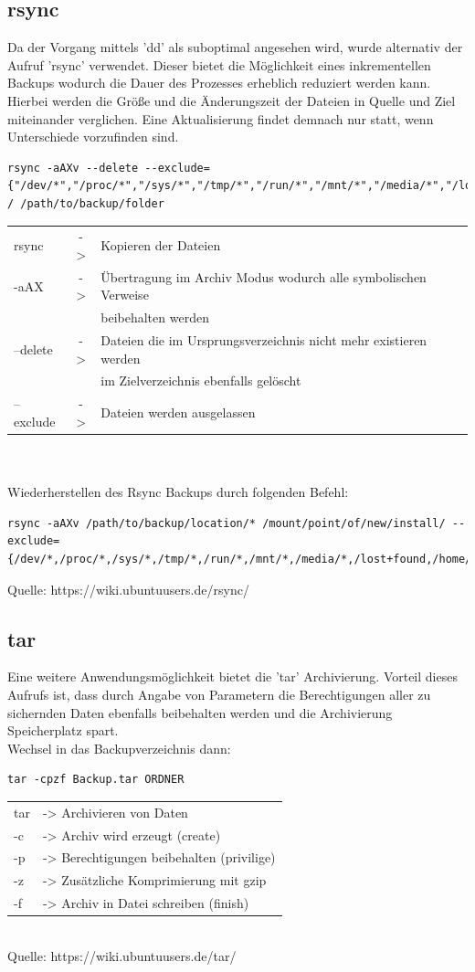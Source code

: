 \subsection{rsync}
Da der Vorgang mittels 'dd' als suboptimal angesehen wird, wurde alternativ der Aufruf 'rsync' verwendet. Dieser bietet die Möglichkeit eines inkrementellen Backups wodurch die Dauer des Prozesses erheblich reduziert werden kann. Hierbei werden die Größe und die Änderungszeit der Dateien in Quelle und Ziel miteinander verglichen. Eine Aktualisierung findet demnach nur statt, wenn Unterschiede vorzufinden sind.
\begin{lstlisting}
rsync -aAXv --delete --exclude={"/dev/*","/proc/*","/sys/*","/tmp/*","/run/*","/mnt/*","/media/*","/lost+found"} / /path/to/backup/folder
\end{lstlisting}
\begin{tabular}{l c l}
rsync	&->& Kopieren der Dateien\\
-aAX	&->& Übertragung im Archiv Modus wodurch alle symbolischen Verweise\\
	&  & beibehalten werden\\
--delete&->& Dateien die im Ursprungsverzeichnis nicht mehr existieren werden\\
	&  & im Zielverzeichnis ebenfalls gelöscht\\
--exclude&->& Dateien werden ausgelassen\\
\end{tabular}\\\\
Wiederherstellen des Rsync Backups durch folgenden Befehl:
\begin{lstlisting}
rsync -aAXv /path/to/backup/location/* /mount/point/of/new/install/ --exclude={/dev/*,/proc/*,/sys/*,/tmp/*,/run/*,/mnt/*,/media/*,/lost+found,/home/*}
\end{lstlisting}
Quelle: https://wiki.ubuntuusers.de/rsync/ \cite{rsync}
\subsection{tar} %
Eine weitere Anwendungsmöglichkeit bietet die 'tar' Archivierung. Vorteil dieses Aufrufs ist, dass durch Angabe von Parametern die Berechtigungen aller zu sichernden Daten ebenfalls beibehalten werden und die Archivierung Speicherplatz spart.\\
Wechsel in das Backupverzeichnis dann:
\begin{lstlisting}
tar -cpzf Backup.tar ORDNER
\end{lstlisting}
\begin{tabular}{l l}
tar	&-> Archivieren von Daten\\
-c	&-> Archiv wird erzeugt (create)\\
-p	&-> Berechtigungen beibehalten (privilige)\\
-z	&-> Zusätzliche Komprimierung mit gzip\\
-f	&-> Archiv in Datei schreiben (finish)\\
\end{tabular}
 ~\\Quelle: https://wiki.ubuntuusers.de/tar/ \cite{tar}

